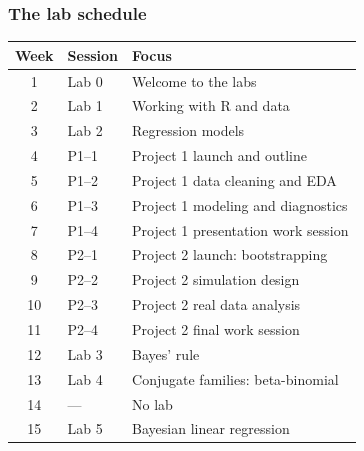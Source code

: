\documentclass[slidestop,compress,mathserif]{beamer}
\begin{document}
\begin{frame}
\frametitle{The lab schedule}

\vspace{-0.8em}
{\scriptsize
\renewcommand{\arraystretch}{0.9}
\begin{center}
\begin{tabular}{cll}
\toprule
\bf Week & \bf Session & \bf Focus \\
\midrule
1 & \color{ccBlue}Lab 0  & Welcome to the labs \\
2  & \color{ccBlue}Lab 1  & Working with R and data \\
3  & \color{ccBlue}Lab 2  & Regression models \\
4  & \color{ccTerra}P1--1 & Project 1 launch and outline \\
5  & \color{ccTerra}P1--2 & Project 1 data cleaning and EDA \\
6  & \color{ccTerra}P1--3 & Project 1 modeling and diagnostics \\
7  & \color{ccTerra}P1--4 & Project 1 presentation work session \\
8  & \color{ccTerra}P2--1 & Project 2 launch: bootstrapping \\
9  & \color{ccTerra}P2--2 & Project 2 simulation design \\
10  & \color{ccTerra}P2--3 & Project 2 real data analysis \\
11 & \color{ccTerra}P2--4 & Project 2 final work session \\
12 & \color{ccBlue}Lab 3  & Bayes' rule \\
13 & \color{ccBlue}Lab 4  & Conjugate families: beta-binomial \\
14 & \color{ccGray}---    & \color{ccGray}No lab \\
15 & \color{ccBlue}Lab 5  & Bayesian linear regression \\
\bottomrule
\end{tabular}
\end{center}}

\vspace{-0.6em}

\end{frame}
\end{document}
